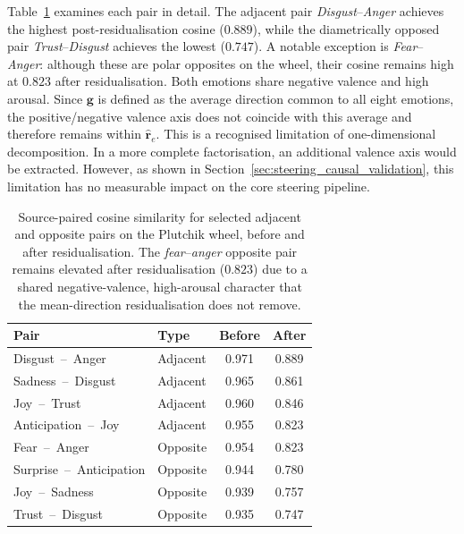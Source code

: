 Table~\ref{tab:plutchik_pairs} examines each pair in detail. The adjacent pair \textit{Disgust}--\textit{Anger} achieves the highest post-residualisation cosine ($0.889$), while the diametrically opposed pair \textit{Trust}--\textit{Disgust} achieves the lowest ($0.747$). A notable exception is \textit{Fear}--\textit{Anger}: although these are polar opposites on the wheel, their cosine remains high at $0.823$ after residualisation. Both emotions share negative valence and high arousal. Since $\mathbf{g}$ is defined as the average direction common to all eight emotions, the positive/negative valence axis does not coincide with this average and therefore remains within $\hat{\mathbf{r}}_e$. This is a recognised limitation of one-dimensional decomposition. In a more complete factorisation, an additional valence axis would be extracted. However, as shown in Section~\ref{sec:steering_causal_validation}, this limitation has no measurable impact on the core steering pipeline.\par

\begin{table}[H]
\centering
\small
\begin{tabular}{llcc}
\toprule
\textbf{Pair} & \textbf{Type} & \textbf{Before} & \textbf{After} \\
\midrule
Disgust~--~Anger         & Adjacent & 0.971 & 0.889 \\
Sadness~--~Disgust       & Adjacent & 0.965 & 0.861 \\
Joy~--~Trust             & Adjacent & 0.960 & 0.846 \\
Anticipation~--~Joy      & Adjacent & 0.955 & 0.823 \\
\midrule
Fear~--~Anger            & Opposite & 0.954 & 0.823 \\
Surprise~--~Anticipation & Opposite & 0.944 & 0.780 \\
Joy~--~Sadness           & Opposite & 0.939 & 0.757 \\
Trust~--~Disgust         & Opposite & 0.935 & 0.747 \\
\bottomrule
\end{tabular}
\caption{Source-paired cosine similarity for selected adjacent and opposite pairs on the Plutchik wheel, before and after residualisation. The \textit{fear}--\textit{anger} opposite pair remains elevated after residualisation ($0.823$) due to a shared negative-valence, high-arousal character that the mean-direction residualisation does not remove.}
\label{tab:plutchik_pairs}
\end{table}

